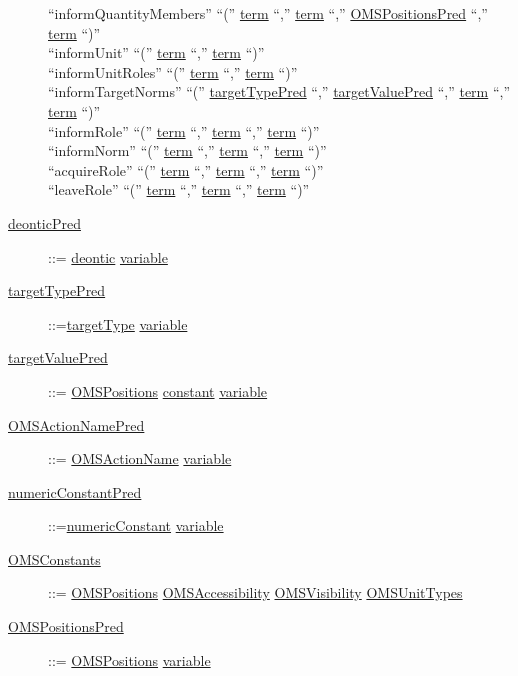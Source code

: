 \begin{description}
		``informQuantityMembers'' ``('' \underline{term} ``,'' \underline{term} ``,'' \underline{OMSPositionsPred} ``,'' \underline{term} ``)'' \textbar \\
		``informUnit'' ``('' \underline{term} ``,'' \underline{term} ``)'' \textbar \\
		``informUnitRoles'' ``('' \underline{term} ``,'' \underline{term} ``)'' \textbar \\ 
		``informTargetNorms'' ``('' \underline{targetTypePred} ``,'' \underline{targetValuePred} ``,'' \underline{term} ``,'' \underline{term} ``)'' \textbar\\
		``informRole'' ``('' \underline{term} ``,'' \underline{term} ``,'' \underline{term} ``)'' \textbar\\
		``informNorm'' ``('' \underline{term} ``,'' \underline{term} ``,'' \underline{term} ``)'' \textbar\\
		``acquireRole'' ``('' \underline{term} ``,'' \underline{term} ``,'' \underline{term} ``)'' \textbar\\
		``leaveRole'' ``('' \underline{term} ``,'' \underline{term} ``,'' \underline{term} ``)'' \textbar


\item[\underline{deonticPred}]::= \underline{deontic} \textbar \underline{variable}

\item[\underline{targetTypePred}]::=\underline{targetType} \textbar  \underline{variable}

\item[\underline{targetValuePred}] ::= \underline{OMSPositions} \textbar \underline{constant} \textbar  \underline{variable}

\item[\underline{OMSActionNamePred}] ::= \underline{OMSActionName} \textbar  \underline{variable}

\item[\underline{numericConstantPred}] ::=\underline{numericConstant} \textbar  \underline{variable}

\item[\underline{OMSConstants}] ::= \underline{OMSPositions} \textbar \underline{OMSAccessibility} \textbar \underline{OMSVisibility} \textbar 
		\underline{OMSUnitTypes}    %

\item[\underline{OMSPositionsPred}] ::= \underline{OMSPositions} \textbar \underline{variable}


\end{description}
